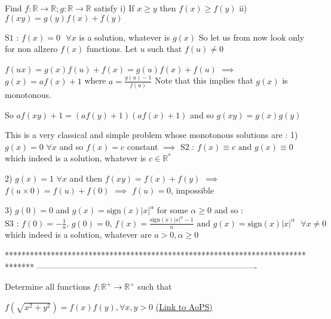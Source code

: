 \begin{solution}
	\begin{tcolorbox}Find $f: \mathbb{R} \rightarrow  \mathbb{R} ; g: \mathbb{R} \rightarrow  \mathbb{R}$ satisfy
i) If $x \ge y$ then $f(x) \ge f(y)$
ii) $f(xy)=g(y)f(x)+f(y)$\end{tcolorbox}
$\boxed{\text{S1 : }f(x)=0\text{  }\forall x}$ is a solution, whatever is $g(x)$
So let us from now look only for non allzero $f(x)$ functions. Let $u$ such that $f(u)\ne 0$

$f(ux)=g(x)f(u)+f(x)=g(u)f(x)+f(u)$ $\implies$ $g(x)=af(x)+1$ where $a=\frac{g(u)-1}{f(u)}$
Note that this implies that $g(x)$ is monotonous.

So $af(xy)+1=(af(y)+1)(af(x)+1)$ and so $g(xy)=g(x)g(y)$

This is a very classical and simple problem whose monotonous solutions are :
1) $g(x)=0$ $\forall x$ and so $f(x)=c$ constant $\implies$ $\boxed{\text{S2 : }f(x)\equiv c\text{ and }g(x)\equiv 0}$ which indeed is a solution, whatever is $c\in\mathbb R^*$

2) $g(x)=1$ $\forall x$ and then $f(xy)=f(x)+f(y)$ $\implies$ $f(u\times 0)=f(u)+f(0)$ $\implies$ $f(u)=0$, impossible

3) $g(0)=0$ and $g(x)=\text{sign}(x)|x|^{\alpha}$ for some $\alpha \ge 0$ and so :
$\boxed{\text{S3 : }f(0)=-\frac 1a\text{, }g(0)=0\text{,  }f(x)=\frac{\text{sign}(x)|x|^{\alpha}-1}a\text{ and }g(x)=\text{sign}(x)|x|^{\alpha}\text{  }\forall x\ne 0}$ which indeed is a solution, whatever are $a>0,\alpha\ge 0$
\end{solution}
*******************************************************************************
-------------------------------------------------------------------------------

\begin{problem}
	Determine all functions $f : \mathbb{R}^+ \to \mathbb{R}^+$ such that 

$f\left ( \sqrt{x^{2}+y^{2}} \right )=f\left ( x \right )f\left ( y \right ),\forall x,y> 0$
	\flushright \href{https://artofproblemsolving.com/community/c6h616958}{(Link to AoPS)}
\end{problem}



